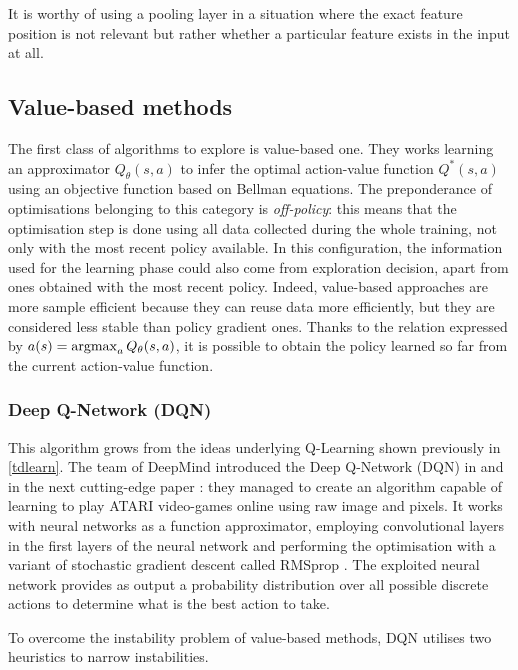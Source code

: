 It is worthy of using a pooling layer in a situation where the exact feature position is not relevant but rather whether a particular feature exists in the input at all.


\subsection{Value-based methods}

The first class of algorithms to explore is value-based one. They works learning an approximator $Q_\theta(s,a)$ to infer the optimal action-value function $Q^*(s,a)$ using an objective function based on Bellman equations.
The preponderance of optimisations belonging to this category is \textit{off-policy}: this means that the optimisation step is done using all data collected during the whole training, not only with the most recent policy available. In this configuration, the information used for the learning phase could also come from exploration decision, apart from ones obtained with the most recent policy. 
Indeed, value-based approaches are more sample efficient because they can reuse data more efficiently, but they are considered less stable than policy gradient ones.
Thanks to the relation expressed by $a(s) = \operatornamewithlimits{argmax}_a Q_\theta(s,a)$, it is possible to obtain the policy learned so far from the current action-value function.

\subsubsection{Deep Q-Network (DQN)}
This algorithm grows from the ideas underlying Q-Learning \cite{watkins1989learning}  shown previously in \vref{tdlearn}. The team of DeepMind introduced the Deep Q-Network (DQN) in \cite{mnih2013playing} and in the next cutting-edge paper \cite{mnih2015human}: they managed to create an algorithm capable of learning to play ATARI video-games online using raw image and pixels. It works with neural networks as a function approximator, employing convolutional layers in the first layers of the neural network and performing the optimisation with a variant of stochastic gradient descent called RMSprop \cite{tieleman2012lecture}. The exploited neural network provides as output a probability distribution over all possible discrete actions to determine what is the best action to take.

To overcome the instability problem of value-based methods, DQN utilises two heuristics to narrow instabilities.

